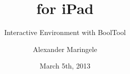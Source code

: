 %

\usebackgroundtemplate{ %
\vbox to \paperheight{\vspace{2.3cm}\hbox to \paperwidth{\hfil\texttt{[image: pics/NyayaAppIcon1024.png]}\hfil}}
}

\title{\Nyaya  for iPad}
\subtitle{Interactive Environment with BoolTool \vspace{1.8cm}}
\author{Alexander Maringele}
\institute[UIBK]{}

\date{March 5th, 2013}



